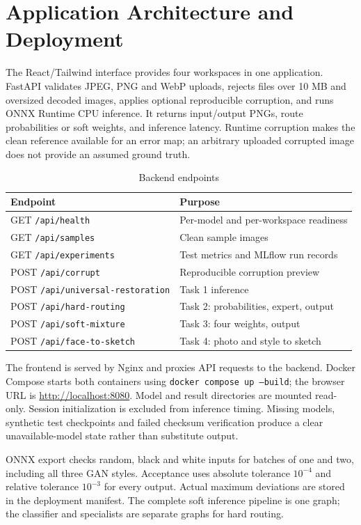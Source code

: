 \documentclass[conference]{IEEEtran}
\begin{document}
\section{Application Architecture and Deployment}
The React/Tailwind interface provides four workspaces in one application.
FastAPI validates JPEG, PNG and WebP uploads, rejects files over 10 MB and
oversized decoded images, applies optional reproducible corruption, and runs
ONNX Runtime CPU inference. It returns input/output PNGs, route probabilities
or soft weights, and inference latency. Runtime corruption makes the clean
reference available for an error map; an arbitrary uploaded corrupted image
does not provide an assumed ground truth.
\begin{table}[!ht]\centering\caption{Backend endpoints}\scriptsize
\begin{tabular}{>{\raggedright\arraybackslash}p{.42\linewidth}>{\raggedright\arraybackslash}p{.46\linewidth}}\toprule Endpoint & Purpose\\\midrule
GET \texttt{/api/health} & Per-model and per-workspace readiness\\
GET \texttt{/api/samples} & Clean sample images\\
GET \texttt{/api/experiments} & Test metrics and MLflow run records\\
POST \texttt{/api/corrupt} & Reproducible corruption preview\\
POST \texttt{/api/universal-restoration} & Task 1 inference\\
POST \texttt{/api/hard-routing} & Task 2: probabilities, expert, output\\
POST \texttt{/api/soft-mixture} & Task 3: four weights, output\\
POST \texttt{/api/face-to-sketch} & Task 4: photo and style to sketch\\\bottomrule
\end{tabular}\end{table}

The frontend is served by Nginx and proxies API requests to the backend.
Docker Compose starts both containers using
\texttt{docker compose up --build}; the browser URL is
\url{http://localhost:8080}. Model and result directories are mounted read-only.
Session initialization is excluded from inference timing. Missing models,
synthetic test checkpoints and failed checksum verification produce a clear
unavailable-model state rather than substitute output.

ONNX export checks random, black and white inputs for batches of one and two,
including all three GAN styles. Acceptance uses absolute tolerance $10^{-4}$
and relative tolerance $10^{-3}$ for every output. Actual maximum deviations
are stored in the deployment manifest. The complete soft inference pipeline is
one graph; the classifier and specialists are separate graphs for hard routing.
\end{document}
